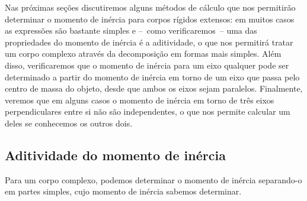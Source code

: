 Nas próximas seções discutiremos alguns métodos de cálculo que nos permitirão determinar o momento de inércia para corpos rígidos extensos: em muitos casos as expressões são bastante simples e --~como verificaremos~-- uma das propriedades do momento de inércia é a aditividade, o que nos permitirá tratar um corpo complexo através da decomposição em formas mais simples. Além disso, verificaremos que o momento de inércia para um eixo qualquer pode ser determinado a partir do momento de inércia em torno de um eixo que passa pelo centro de massa do objeto, desde que ambos os eixos sejam paralelos. Finalmente, veremos que em alguns casos o momento de inércia em torno de três eixos perpendiculares entre si não são independentes, o que nos permite calcular um deles se conhecemos os outros dois.

\subsection{Aditividade do momento de inércia}

\begin{marginfigure}
\centering
{}
\caption{Para um corpo complexo, podemos determinar o momento de inércia separando-o em partes simples, cujo momento de inércia sabemos determinar. \label{Fig:AditividadeMomInercia}}
\end{marginfigure}

